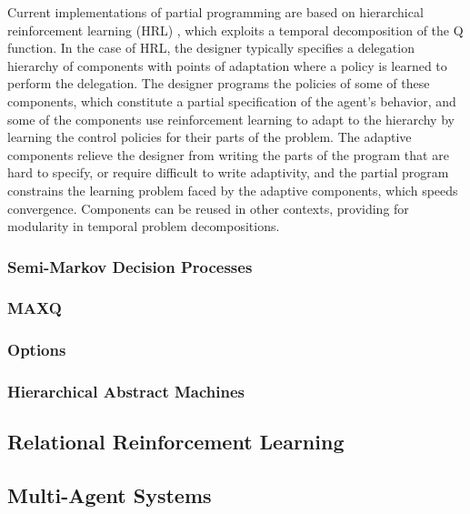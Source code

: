 Current implementations of partial programming are based on hierarchical reinforcement learning (HRL) \cite{dietterich1998maxq,dietterich2000hierarchical,sutton1999between,parr1998reinforcement,andre2000programmable,andre2002state,marthi2005concurrent}, which exploits a temporal decomposition of the Q function.  In the case of HRL, the designer typically specifies a delegation hierarchy of components with points of adaptation where a policy is learned to perform the delegation.  The designer programs the policies of some of these components, which constitute a partial specification of the agent's behavior, and some of the components use reinforcement learning to adapt to the hierarchy by learning the control policies for their parts of the problem.  The adaptive components relieve the designer from writing the parts of the program that are hard to specify, or require difficult to write adaptivity, and the partial program constrains the learning problem faced by the adaptive components, which speeds convergence.  Components can be reused in other contexts, providing for modularity in temporal problem decompositions.

\subsubsection{Semi-Markov Decision Processes}

\subsubsection{MAXQ}

\subsubsection{Options}

\subsubsection{Hierarchical Abstract Machines}


\subsection{Relational Reinforcement Learning}

\subsection{Multi-Agent Systems}
